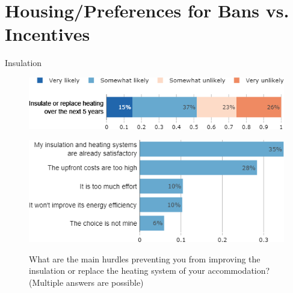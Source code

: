 \documentclass[aspectratio=169,9pt,dvipsnames]{beamer}
\begin{document}
\section{Housing/Preferences for Bans vs. Incentives}

\begin{frame}{Insulation}%
\vspace{-.5cm}
\begin{figure}[h!]
\caption{How likely is it that you will improve the insulation or replace the heating system of your accommodation over the next 5 years?}
\includegraphics[width=.6\textwidth]{../figures/US/will_insulate_US.png} \\
\vspace{.1cm}
\caption{What are the main hurdles preventing you from improving the insulation or replace the heating system of your accommodation? (Multiple answers are possible)}
\includegraphics[width=.54\textwidth]{../figures/US/obstacles_insulation_US.png}\\
\end{figure}
\end{frame}
\end{document}
